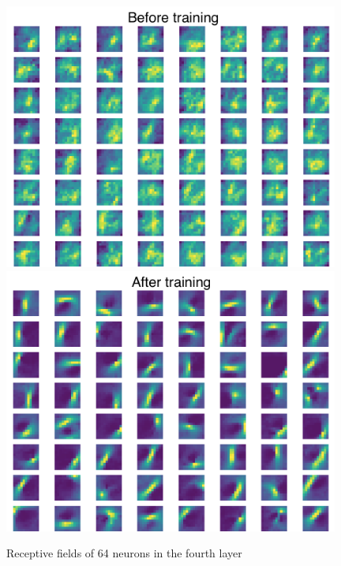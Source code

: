 \documentclass[12pt]{article}
\begin{document}
\begin{figure}[!htbp]
	\centering
	\includegraphics[width=11cm]{predictive_coding_stacked2_experiment4 before}
	\includegraphics[width=11cm]{predictive_coding_stacked2_experiment4 after}
	\caption{Receptive fields of 64 neurons in the fourth layer}
	\label{fig:experiment4}
\end{figure} 
\end{document}
